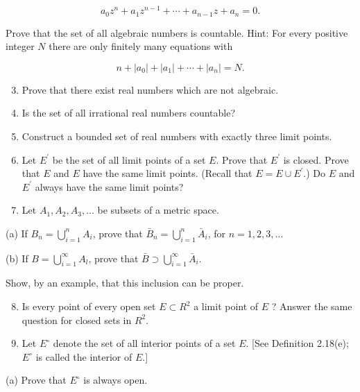 \documentclass[10pt]{article}
\begin{document}
$$
a_{0} z^{n}+a_{1} z^{n-1}+\cdots+a_{n-1} z+a_{n}=0 .
$$

Prove that the set of all algebraic numbers is countable. Hint: For every positive integer $N$ there are only finitely many equations with

$$
n+\left|a_{0}\right|+\left|a_{1}\right|+\cdots+\left|a_{n}\right|=N .
$$

\begin{enumerate}
  \setcounter{enumi}{2}
  \item Prove that there exist real numbers which are not algebraic.

  \item Is the set of all irrational real numbers countable?

  \item Construct a bounded set of real numbers with exactly three limit points.

  \item Let $E^{\prime}$ be the set of all limit points of a set $E$. Prove that $E^{\prime}$ is closed. Prove that $E$ and $E$ have the same limit points. (Recall that $E=E \cup E^{\prime}$.) Do $E$ and $E^{\prime}$ always have the same limit points?

  \item Let $A_{1}, A_{2}, A_{3}, \ldots$ be subsets of a metric space.

\end{enumerate}

(a) If $B_{n}=\bigcup_{i=1}^{n} A_{i}$, prove that $\bar{B}_{n}=\bigcup_{i=1}^{n} \bar{A}_{i}$, for $n=1,2,3, \ldots$

(b) If $B=\bigcup_{i=1}^{\infty} A_{l}$, prove that $\bar{B} \supset \bigcup_{i=1}^{\infty} \bar{A}_{i}$.

Show, by an example, that this inclusion can be proper.

\begin{enumerate}
  \setcounter{enumi}{7}
  \item Is every point of every open set $E \subset R^{2}$ a limit point of $E$ ? Answer the same question for closed sets in $R^{2}$.

  \item Let $E^{\circ}$ denote the set of all interior points of a set $E$. [See Definition 2.18(e); $E^{\circ}$ is called the interior of $E$.]

\end{enumerate}

(a) Prove that $E^{\circ}$ is always open.
\end{document}
